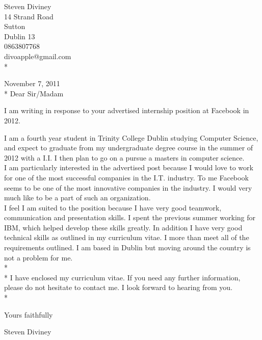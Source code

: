 \documentclass{res}
\begin{document}
 

\begin{flushright}
   Steven Diviney \\
   14 Strand Road \\
   Sutton \\
   Dublin 13 \\
   0863807768 \\
   divoapple@gmail.com \\* \vspace{10 mm}
\end{flushright}
\begin{flushleft}
 
November 7, 2011\\*\vspace{10 mm}
Dear Sir/Madam
\end{flushleft}
I am writing in response to your advertised internship position at Facebook in 2012.

I am a fourth year student in Trinity College Dublin studying Computer Science, and expect to graduate from my undergraduate degree course in the summer of 2012 with a I.I. I then plan to go on a pursue a masters in computer science.\\
I am particularly interested in the advertised post because I would love to work for one of the most successful companies in the I.T. industry. To me Facebook seems to be one of the most innovative companies in the industry. I would very much like to be a part of such an organization.\\
I feel I am suited to the position because I have very good teamwork, communication and presentation skills. I spent the previous summer working for IBM, which helped develop these skills greatly. In addition I have very good technical skills as outlined in my curriculum vitae. I more than meet all of the requirements outlined. I am based in Dublin but moving around the country is not a problem for me.
\\*
\\*
I have enclosed my curriculum vitae. If you need any further information, please do not hesitate to contact me. I look forward to hearing from you.\\*

\begin{flushleft}
Yours faithfully\\\vspace{10mm}

Steven Diviney\\
\end{flushleft}
\end{document}
